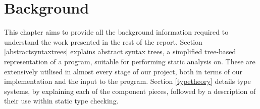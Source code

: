 \documentclass[nofilelist]{cslthse-msc}
\newcommand{\CR}[1]{\textcolor{green!60!black}{[\textbf{CR}:#1]}}
\begin{document}
\chapter{Background}
This chapter aims to provide all the background information required to understand the work presented in the rest of the report.
Section \ref{abstractsyntaxtrees} explains abstract syntax trees, a simplified tree-based representation of a program, suitable for performing static analysis on.
These are extensively utilised in almost every stage of our project, both in terms of our implementation and the input to the program.
Section \ref{typetheory} details type systems, by explaining each of the component pieces, followed by a description of their use within static type checking.
\end{document}
